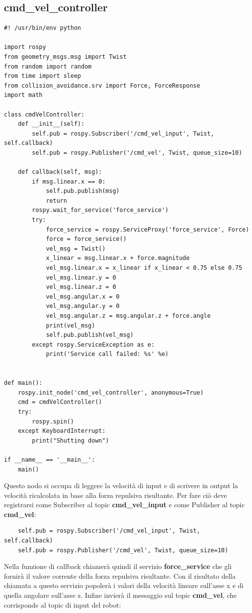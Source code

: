 \documentclass[Lau, binding=0.6cm, oneside]{sapthesis}
\begin{document}
\subsection{cmd\_vel\_controller}
\begin{lstlisting}
#! /usr/bin/env python

import rospy
from geometry_msgs.msg import Twist
from random import random
from time import sleep
from collision_avoidance.srv import Force, ForceResponse
import math

class cmdVelController:
    def __init__(self):
        self.pub = rospy.Subscriber('/cmd_vel_input', Twist, self.callback)
        self.pub = rospy.Publisher('/cmd_vel', Twist, queue_size=10)
    
    def callback(self, msg):
        if msg.linear.x == 0:
            self.pub.publish(msg)
            return
        rospy.wait_for_service('force_service')
        try:
            force_service = rospy.ServiceProxy('force_service', Force)
            force = force_service()
            vel_msg = Twist()
            x_linear = msg.linear.x + force.magnitude
            vel_msg.linear.x = x_linear if x_linear < 0.75 else 0.75
            vel_msg.linear.y = 0
            vel_msg.linear.z = 0
            vel_msg.angular.x = 0
            vel_msg.angular.y = 0
            vel_msg.angular.z = msg.angular.z + force.angle
            print(vel_msg)
            self.pub.publish(vel_msg)
        except rospy.ServiceException as e:
            print('Service call failed: %s' %e)


def main():
    rospy.init_node('cmd_vel_controller', anonymous=True)
    cmd = cmdVelController()
    try:
        rospy.spin()
    except KeyboardInterrupt:
        print("Shutting down")

if __name__ == '__main__':
    main()
\end{lstlisting}

Questo nodo si occupa di leggere la velocità di input e di scrivere in output la velocità ricalcolata in base alla forza repulsiva risultante.
Per fare ciò deve registrarsi come Subscriber al topic \textbf{cmd\_vel\_input} e come Publisher al topic \textbf{cmd\_vel}:

\begin{lstlisting}
    self.pub = rospy.Subscriber('/cmd_vel_input', Twist, self.callback)
    self.pub = rospy.Publisher('/cmd_vel', Twist, queue_size=10)
\end{lstlisting}

Nella funzione di callback chiamerà quindi il servizio \textbf{force\_service} che gli fornirà il valore corrente della forza repulsiva risultante.
Con il risultato della chiamata a questo servizio popolerà i valori della velocità lineare sull'asse x e di quella angolare sull'asse z.
Infine invierà il messaggio sul topic \textbf{cmd\_vel}, che corrisponde al topic di input del robot:
\end{document}
